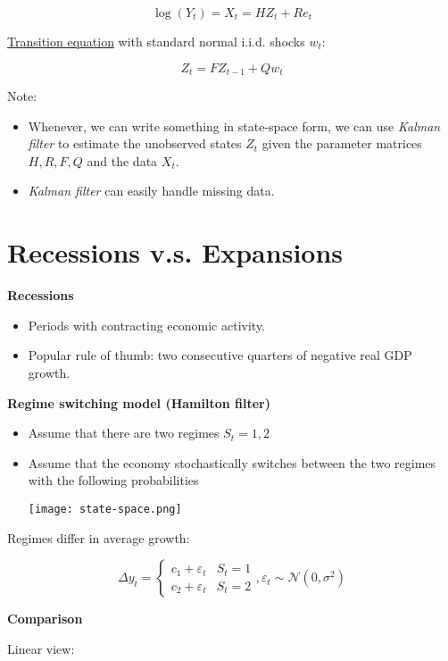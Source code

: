 \documentclass{article}
\begin{document}
\[\log(Y_t)=X_t=HZ_t+Re_t \]

\underline{Transition equation} with standard normal i.i.d. shocks $w_t$:

\[Z_t=FZ_{t-1}+Qw_t \]

Note: 

\begin{itemize}
    \item Whenever, we can write something in state-space form, we can use \textit{Kalman filter} to estimate the unobserved states $Z_t$ given the parameter matrices $H, R, F, Q$ and the data $X_t$.
    \item \textit{Kalman filter} can easily handle missing data.
\end{itemize}

\section{Recessions v.s. Expansions}

\textbf{Recessions}

\begin{itemize}
    \item Periods with contracting economic activity.
    \item Popular rule of thumb: two consecutive quarters of negative real GDP growth.
\end{itemize}

\textbf{Regime switching model (Hamilton filter)}

\begin{itemize}
    \item Assume that there are two regimes $S_t=1, 2$
    \item Assume that the economy stochastically switches between the two regimes with the following probabilities
    \begin{center}
        \texttt{[image: state-space.png]}
    \end{center}
\end{itemize}

Regimes differ in average growth:

\[
\Delta y_t = 
\begin{cases}
c_1+\varepsilon_t & S_t=1 \\
c_2+\varepsilon_t & S_t=2
\end{cases},
\varepsilon_t\sim\mathcal{N}(0,\sigma^2)
\]

\textbf{Comparison}

Linear view:
\end{document}

